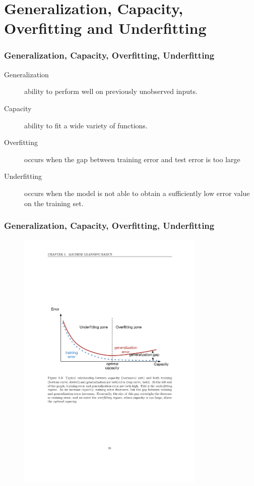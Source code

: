 \documentclass{beamer}
\begin{document}
\section{Generalization, Capacity, Overfitting and Underfitting}

\begin{frame}
  \frametitle{Generalization, Capacity, Overfitting, Underfitting}
  
  \begin{description}
    \item[Generalization] ability to perform well on previously unobserved inputs.
    \item[Capacity] ability to fit a wide variety of functions.
    \item[Overfitting] occurs when the gap between training error and test error is too large
    \item[Underfitting] occurs when the model is not able to obtain a sufficiently low error value on the training set.
  \end{description}
\end{frame}

\begin{frame}
  \frametitle{Generalization, Capacity, Overfitting, Underfitting}

  \begin{figure}
    \centering
    \includegraphics[width=0.8\textwidth]{relationships_between_terms.pdf}
  \end{figure}
\end{frame}
\end{document}
